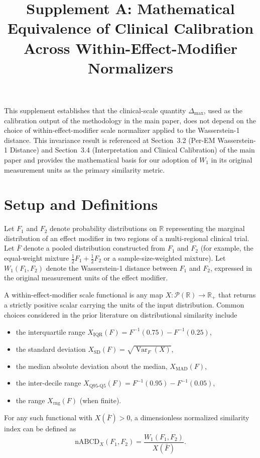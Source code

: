 \documentclass[11pt]{article}
\title{Supplement A: Mathematical Equivalence of Clinical Calibration Across Within-Effect-Modifier Normalizers}
\date{}
\begin{document}
\maketitle

This supplement establishes that the clinical-scale quantity $\Delta_{\max}$, used as the calibration output of the methodology in the main paper, does not depend on the choice of within-effect-modifier scale normalizer applied to the Wasserstein-1 distance. This invariance result is referenced at Section~3.2 (Per-EM Wasserstein-1 Distance) and Section~3.4 (Interpretation and Clinical Calibration) of the main paper and provides the mathematical basis for our adoption of $W_1$ in its original measurement units as the primary similarity metric.

\section{Setup and Definitions}\label{sec:supA_setup}

Let $F_1$ and $F_2$ denote probability distributions on $\mathbb{R}$ representing the marginal distribution of an effect modifier in two regions of a multi-regional clinical trial. Let $\bar{F}$ denote a pooled distribution constructed from $F_1$ and $F_2$ (for example, the equal-weight mixture $\tfrac{1}{2} F_1 + \tfrac{1}{2} F_2$ or a sample-size-weighted mixture). Let $W_1(F_1, F_2)$ denote the Wasserstein-1 distance between $F_1$ and $F_2$, expressed in the original measurement units of the effect modifier.

A within-effect-modifier scale functional is any map $X : \mathcal{P}(\mathbb{R}) \to \mathbb{R}_+$ that returns a strictly positive scalar carrying the units of the input distribution. Common choices considered in the prior literature on distributional similarity include
\begin{itemize}
\item the interquartile range $X_{\text{IQR}}(F) = F^{-1}(0.75) - F^{-1}(0.25)$,
\item the standard deviation $X_{\text{SD}}(F) = \sqrt{\operatorname{Var}_F(X)}$,
\item the median absolute deviation about the median, $X_{\text{MAD}}(F)$,
\item the inter-decile range $X_{\text{Q95-Q5}}(F) = F^{-1}(0.95) - F^{-1}(0.05)$,
\item the range $X_{\text{rng}}(F)$ (when finite).
\end{itemize}
For any such functional with $X(\bar{F}) > 0$, a dimensionless normalized similarity index can be defined as
\begin{equation}
\text{nABCD}_X(F_1, F_2) = \frac{W_1(F_1, F_2)}{X(\bar{F})}.
\label{eq:supA_nabcd}
\end{equation}
\end{document}
